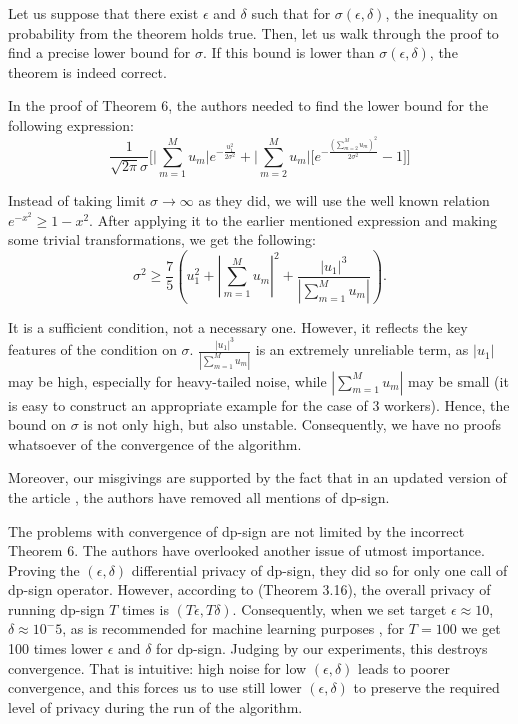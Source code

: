 \documentclass[12pt]{article}
\begin{document}
Let us suppose that there exist $\epsilon$ and $\delta$ such that for $\sigma(\epsilon, \delta)$, the inequality on probability from the theorem holds true. Then, let us walk through the proof to find a precise lower bound for $\sigma$. If this bound is lower than $\sigma(\epsilon, \delta)$, the theorem is indeed correct.

In the proof of Theorem 6, the authors needed to find the lower bound for the following expression:
$$\frac{1}{\sqrt{2\pi}\sigma}\bigg[\bigg|\sum_{m=1}^{M}u_{m}\bigg|e^{-\frac{u_{1}^2}{2\sigma^2}}+\bigg|\sum_{m=2}^{M}u_{m}\bigg|\bigg[e^{-\frac{(\sum_{m=2}^{M}u_{m})^2}{2\sigma^2}}-1\bigg]\bigg]$$

Instead of taking limit $\sigma \to \infty$ as they did, we will use the well known relation $e^{-x^2} \geq 1 - x^2$. After applying it to the earlier mentioned expression and making some trivial transformations, we get the following:
$$\sigma^2 \geq
\frac{7}{5} \left(u_1^2 + \left|\sum_{m=1}^M u_m\right|^2 + \frac{|u_1|^3}{\left|\sum_{m=1}^M u_m\right|}\right).
$$

It is a sufficient condition, not a necessary one. However, it reflects the key features of the condition on $\sigma$. $\frac{|u_1|^3}{\left|\sum_{m=1}^M u_m\right|}$ is an extremely unreliable term, as $|u_1|$ may be high, especially for heavy-tailed noise, while $\left|\sum_{m=1}^M u_m\right|$ may be small (it is easy to construct an appropriate example for the case of 3 workers). Hence, the bound on $\sigma$ is not only high, but also unstable. Consequently, we have no proofs whatsoever of the convergence of the algorithm.

Moreover, our misgivings are supported by the fact that in an updated version \cite{Jin2024} of the article \cite{Jin2020}, the authors have removed all mentions of dp-sign.

The problems with convergence of dp-sign are not limited by the incorrect Theorem 6. The authors have overlooked another issue of utmost importance. Proving the $(\epsilon, \delta)$ differential privacy of dp-sign, they did so for only one call of dp-sign operator. However, according to \cite{Dwork2014} (Theorem 3.16), the overall privacy of running dp-sign $T$ times is $(T \epsilon, T \delta)$. Consequently, when we set target $\epsilon \approx 10$, $\delta \approx 10^-5$, as is recommended for machine learning purposes \cite{Ponomareva2023}, for $T = 100$ we get 100 times lower $\epsilon$ and $\delta$ for dp-sign. Judging by our experiments, this destroys convergence. That is intuitive: high noise for low $(\epsilon, \delta)$ leads to poorer convergence, and this forces us to use still lower $(\epsilon, \delta)$ to preserve the required level of privacy during the run of the algorithm.
\end{document}
